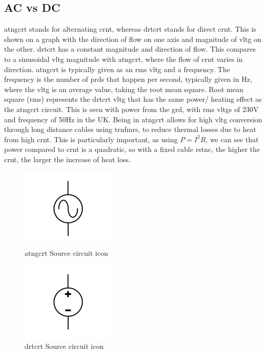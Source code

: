 \documentclass[a4paper,11pt]{report}
\begin{document}
\vspace*{1\baselineskip}

\subsection{AC vs DC}

\gls{atngcrt} stands for alternating \gls{crnt}, whereas \gls{drtcrt} stands for direct \gls{crnt}. This is shown on a graph with the direction of flow on one axis and magnitude of \gls{vltg} on the other. \gls{drtcrt} has a constant magnitude and direction of flow. This compares to a sinusoidal \gls{vltg} magnitude with \gls{atngcrt}, where the flow of \gls{crnt} varies in direction. \gls{atngcrt} is typically given as an \gls{rms} \gls{vltg} and a frequency. The frequency is the number of \gls{prd}s that happen per second, typically given in Hz, where the \gls{vltg} is an average value, taking the root mean square. Root mean square (\gls{rms}) represents the \gls{drtcrt} \gls{vltg} that has the same power/ heating effect as the \gls{atngcrt} circuit. This is seen with power from the \gls{grd}, with \gls{rms} \gls{vltg}s of 230V and frequency of 50Hz in the UK.
Being in \gls{atngcrt} allows for high \gls{vltg} conversion through long distance cables using \gls{trnfmr}s, to reduce thermal losses due to heat from high \gls{crnt}.
This is particularly important, as using $P=I^2R$, we can see that power compared to \gls{crnt} is a quadratic, so with a fixed cable \gls{rstnc}, the higher the \gls{crnt}, the larger the increase of heat loss.

\begin{figure}[H]
\centering
\includegraphics[width=0.4\textwidth]{acsource1}
\caption{\gls{atngcrt} Source circuit icon}
\end{figure}

\begin{figure}[H]
\centering
\includegraphics[width=0.4\textwidth]{dcsource1}
\caption{\gls{drtcrt} Source circuit icon}
\end{figure}
\end{document}
